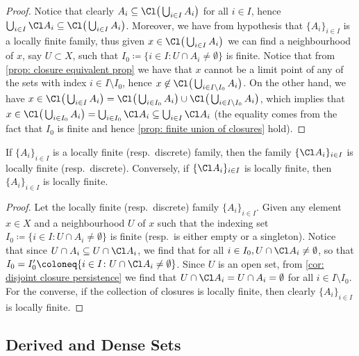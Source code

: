\begin{proof}
Notice that clearly \(A_i \subseteq \Cl\big(\bigcup_{i \in I} A_i\big)\) for all
\(i \in I\), hence
\(\bigcup_{i \in I} \Cl A_i \subseteq \Cl\big(\bigcup_{i \in I}
A_i\big)\). Moreover, we have from hypothesis that \(\{A_i\}_{i \in I}\) is a
locally finite family, thus given \(x \in \Cl\big(\bigcup_{i \in I} A_i\big)\)
we can find a neighbourhood of \(x\), say \(U \subset X\), such that
\(I_0 \coloneq \{i \in I \colon U \cap A_i \neq \emptyset\}\) is finite. Notice
that from \cref{prop: closure equivalent prop} we have that \(x\) cannot be a
limit point of any of the sets with index \(i \in I \setminus I_0\), hence
\(x \not\in \Cl\big(\bigcup_{i \in I \setminus I_0} A_i\big)\). On the other
hand, we have
\(x \in \Cl\big(\bigcup_{i \in I} A_i\big) = \Cl\big(\bigcup_{i \in I_0}
A_i\big) \cup \Cl\big(\bigcup_{i \in I \setminus I_0} A_i\big)\), which implies
that
\(x \in \Cl\big(\bigcup_{i \in I_0} A_i\big) = \bigcup_{i \in I_0} \Cl A_i
\subseteq \bigcup_{i \in I} \Cl A_i\) (the equality comes from the fact
that \(I_0\) is finite and hence \cref{prop: finite union of closures} hold).
\end{proof}

\begin{proposition}
If \(\{A_i\}_{i \in I}\) is a locally finite (resp.\ discrete) family, then the
family \(\{\Cl A_i\}_{i \in I}\) is locally finite (resp.\ discrete). Conversely,
if \(\{\Cl A_i\}_{i \in I}\) is locally finite, then \(\{A_i\}_{i \in I}\) is
locally finite.
\end{proposition}

\begin{proof}
Let the locally finite (resp.\ discrete) family \(\{A_i\}_{i \in I}\). Given any
element \(x \in X\) and a neighbourhood \(U\) of \(x\) such that the indexing
set \(I_0 \coloneq \{i \in I \colon U \cap A_i \neq \emptyset\}\) is finite
(resp.\ is either empty or a singleton). Notice that since
\(U \cap A_i \subseteq U \cap \Cl A_i\), we find that for all
\(i \in I_0, U \cap \Cl A_i \neq \emptyset\), so that
\(I_0 = I_0' \coloneq \{i \in I \colon U \cap \Cl A_i \neq \emptyset\}\). Since
\(U\) is an open set, from \cref{cor: disjoint closure persistence} we find that
\(U \cap \Cl A_i = U \cap A_i = \emptyset\) for all \(i \in I \setminus
I_0\). For the converse, if the collection of closures is locally finite, then
clearly \(\{A_{i}\}_{i \in I}\) is locally finite.
\end{proof}

\subsection{Derived and Dense Sets}

